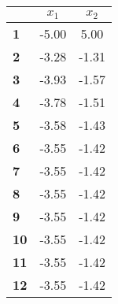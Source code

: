 \begin{small}\begin{tabular}{|l|c|c|}
\hline
&\textbf{$x_1$}&\textbf{$x_2$}\\\hline
\textbf{1}&-5.00&5.00\\\hline
\textbf{2}&-3.28&-1.31\\\hline
\textbf{3}&-3.93&-1.57\\\hline
\textbf{4}&-3.78&-1.51\\\hline
\textbf{5}&-3.58&-1.43\\\hline
\textbf{6}&-3.55&-1.42\\\hline
\textbf{7}&-3.55&-1.42\\\hline
\textbf{8}&-3.55&-1.42\\\hline
\textbf{9}&-3.55&-1.42\\\hline
\textbf{10}&-3.55&-1.42\\\hline
\textbf{11}&-3.55&-1.42\\\hline
\textbf{12}&-3.55&-1.42\\\hline
\end{tabular}
\end{small}